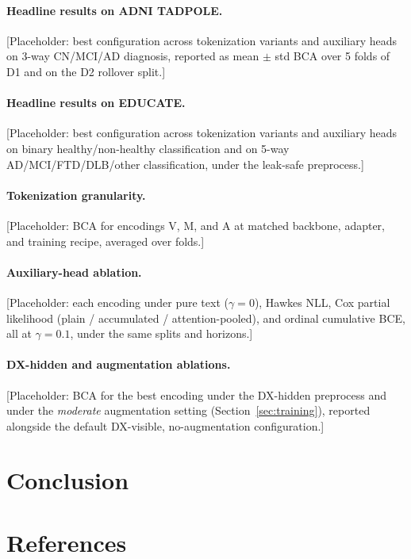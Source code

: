 \documentclass{article}
\begin{document}
\paragraph{Headline results on ADNI TADPOLE.}
[Placeholder: best configuration across tokenization variants and auxiliary heads on 3-way CN/MCI/AD diagnosis, reported as mean $\pm$ std BCA over 5 folds of D1 and on the D2 rollover split.]

\paragraph{Headline results on EDUCATE.}
[Placeholder: best configuration across tokenization variants and auxiliary heads on binary healthy/non-healthy classification and on 5-way AD/MCI/FTD/DLB/other classification, under the leak-safe preprocess.]

\paragraph{Tokenization granularity.}
[Placeholder: BCA for encodings V, M, and A at matched backbone, adapter, and training recipe, averaged over folds.]

\paragraph{Auxiliary-head ablation.}
[Placeholder: each encoding under pure text ($\gamma=0$), Hawkes NLL, Cox partial likelihood (plain / accumulated / attention-pooled), and ordinal cumulative BCE, all at $\gamma=0.1$, under the same splits and horizons.]

\paragraph{DX-hidden and augmentation ablations.}
[Placeholder: BCA for the best encoding under the DX-hidden preprocess and under the \emph{moderate} augmentation setting (Section~\ref{sec:training}), reported alongside the default DX-visible, no-augmentation configuration.]

\section{Conclusion}




\section*{References}


\end{document}
